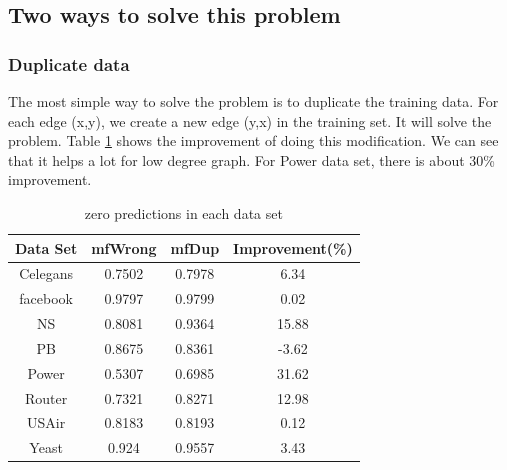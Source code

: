\documentclass[12pt]{article}
\begin{document}
\subsection{Two ways to solve this problem}

\subsubsection{Duplicate data}
The most simple way to solve the problem is to duplicate the training data. For each edge (x,y), we create a new edge (y,x) in the training set. It will solve the problem. Table \ref{tab:dup} shows the improvement of doing this modification. We can see that it helps a lot for low degree graph. For Power data set, there is about 30\% improvement. 

\begin{table}
	\begin{center}
		\begin{tabular}{|c|c|c|c|}
			\hline
			Data Set & mfWrong & mfDup & Improvement(\%) \\
			\hline
			Celegans&0.7502&0.7978&6.34\\
			facebook&0.9797&0.9799&0.02\\
			NS&0.8081&0.9364&15.88\\
			PB&0.8675&0.8361&-3.62\\
			Power&0.5307&0.6985&31.62\\
			Router&0.7321&0.8271&12.98\\
			USAir&0.8183&0.8193&0.12\\
			Yeast&0.924&0.9557&3.43\\
			\hline
		\end{tabular}
	\end{center}
	\caption{zero predictions in each data set}
	\label{tab:dup}
\end{table}





	
	
\end{document}
